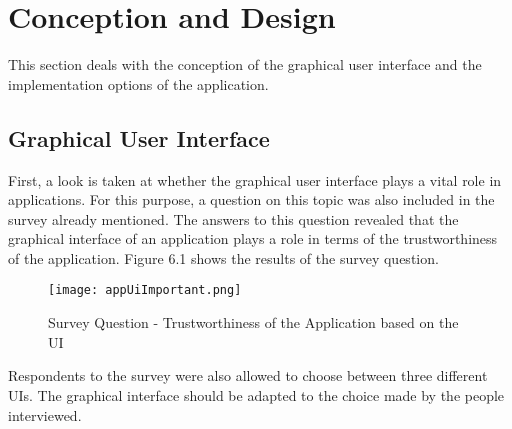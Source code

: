 

\chapter{Conception and Design}
This section deals with the conception of the graphical user interface and the implementation options of the application.
\section{Graphical User Interface}
First, a look is taken at whether the graphical user interface plays a vital role in applications. For this purpose, a question on this topic was also included in the survey already mentioned. The answers to this question revealed that the graphical interface of an application plays a role in terms of the trustworthiness of the application. Figure 6.1 shows the results of the survey question.
\begin{figure}[H]
	\centering
	\texttt{[image: appUiImportant.png]}
	\caption[Survey Question]{Survey Question - Trustworthiness of the Application based on the UI}
\end{figure}
\noindent
Respondents to the survey were also allowed to choose between three different UIs. The graphical interface should be adapted to the choice made by the people interviewed.
